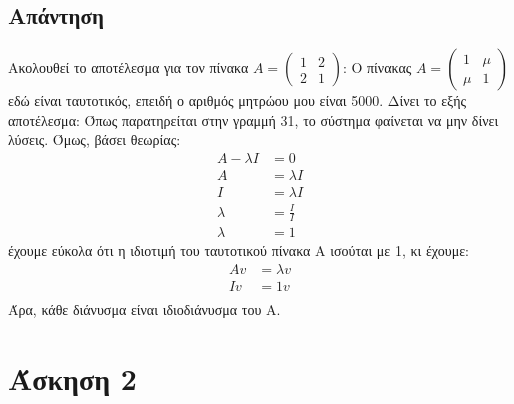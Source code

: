 \documentclass[a4paper,12pt]{article}
\begin{document}
\subsection{Απάντηση}
Ακολουθεί το αποτέλεσμα για τον πίνακα $
	A=\begin{pmatrix}
		1 & 2 \\
		2 & 1
	\end{pmatrix}
$:
Ο πίνακας $
	A=\begin{pmatrix}
		1   & \mu \\
		\mu & 1
	\end{pmatrix}
$ εδώ είναι ταυτοτικός, επειδή ο αριθμός μητρώου μου είναι 5000. Δίνει το εξής
αποτέλεσμα:
Όπως παρατηρείται στην γραμμή 31, το σύστημα φαίνεται να μην δίνει λύσεις. Όμως,
βάσει θεωρίας:
\begin{equation}
	\begin{split}
		A - \lambda I &= 0 \\
		A &= \lambda I \\
		I &= \lambda I \\
		\lambda & =\frac{I}{I} \\
		\lambda & =1
	\end{split}
\end{equation}
έχουμε εύκολα ότι η ιδιοτιμή του ταυτοτικού  πίνακα Α ισούται με 1, κι έχουμε:
\begin{equation}
	\begin{split}
		A v &= \lambda v \\
		I v&= 1 v \\
	\end{split}
\end{equation}
Άρα, κάθε διάνυσμα είναι ιδιοδιάνυσμα του Α.
\newpage\section{Άσκηση 2}
\end{document}

